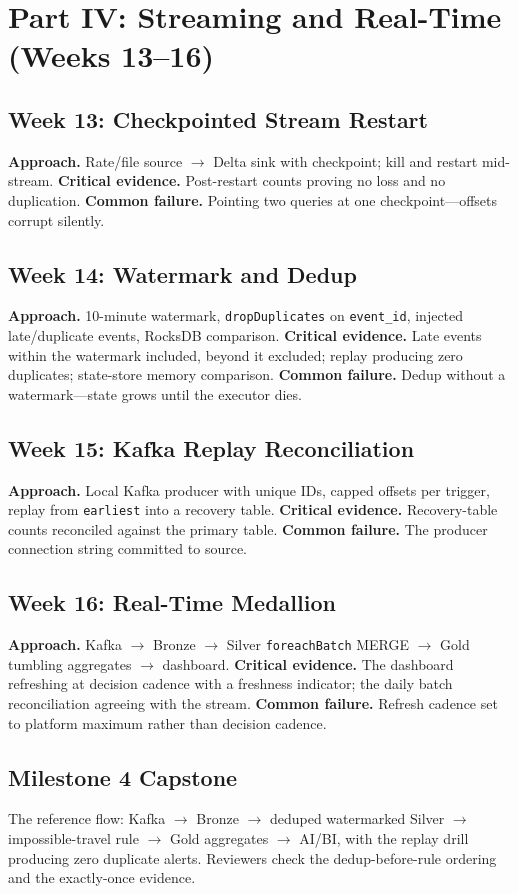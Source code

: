 \section{Part IV: Streaming and Real-Time (Weeks 13--16)}
\subsection{Week 13: Checkpointed Stream Restart}
\textbf{Approach.} Rate/file source $\rightarrow$ Delta sink with checkpoint; kill and restart
mid-stream.
\textbf{Critical evidence.} Post-restart counts proving no loss and no duplication.
\textbf{Common failure.} Pointing two queries at one checkpoint---offsets corrupt silently.

\subsection{Week 14: Watermark and Dedup}
\textbf{Approach.} 10-minute watermark, \texttt{dropDuplicates} on \texttt{event\_id}, injected
late/duplicate events, RocksDB comparison.
\textbf{Critical evidence.} Late events within the watermark included, beyond it excluded; replay
producing zero duplicates; state-store memory comparison.
\textbf{Common failure.} Dedup without a watermark---state grows until the executor dies.

\subsection{Week 15: Kafka Replay Reconciliation}
\textbf{Approach.} Local Kafka producer with unique IDs, capped offsets per trigger, replay from
\texttt{earliest} into a recovery table.
\textbf{Critical evidence.} Recovery-table counts reconciled against the primary table.
\textbf{Common failure.} The producer connection string committed to source.

\subsection{Week 16: Real-Time Medallion}
\textbf{Approach.} Kafka $\rightarrow$ Bronze $\rightarrow$ Silver \texttt{foreachBatch} MERGE
$\rightarrow$ Gold tumbling aggregates $\rightarrow$ dashboard.
\textbf{Critical evidence.} The dashboard refreshing at decision cadence with a freshness
indicator; the daily batch reconciliation agreeing with the stream.
\textbf{Common failure.} Refresh cadence set to platform maximum rather than decision cadence.

\subsection{Milestone 4 Capstone}
The reference flow: Kafka $\rightarrow$ Bronze $\rightarrow$ deduped watermarked Silver
$\rightarrow$ impossible-travel rule $\rightarrow$ Gold aggregates $\rightarrow$ AI/BI, with the
replay drill producing zero duplicate alerts. Reviewers check the dedup-before-rule ordering and
the exactly-once evidence.

